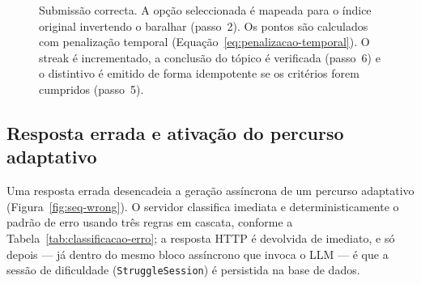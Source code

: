\begin{figure}[H]
	\caption[Sequ\^encia de resposta correcta a um desafio]{Submiss\~ao correcta. A op\c{c}\~ao seleccionada \'e mapeada para o \'indice original invertendo o baralhar (passo~2). Os pontos s\~ao calculados com penaliza\c{c}\~ao temporal (Equa\c{c}\~ao~\ref{eq:penalizacao-temporal}). O streak \'e incrementado, a conclus\~ao do t\'opico \'e verificada (passo~6) e o distintivo \'e emitido de forma idempotente se os crit\'erios forem cumpridos (passo~5).}
	\label{fig:seq-correct}
\end{figure}

\subsection{Resposta errada e ativa\c{c}\~ao do percurso adaptativo}
\label{ssec:seq-wrong}

Uma resposta errada desencadeia a gera\c{c}\~ao ass\'incrona de um percurso
adaptativo (Figura~\ref{fig:seq-wrong}). O servidor classifica imediata e
deterministicamente o padr\~ao de erro usando tr\^es regras em cascata,
conforme a Tabela~\ref{tab:classificacao-erro}; a resposta HTTP \'e
devolvida de imediato, e s\'o depois --- j\'a dentro do mesmo bloco
ass\'incrono que invoca o LLM --- \'e que a sess\~ao de dificuldade
(\texttt{StruggleSession}) \'e persistida na base de dados.

